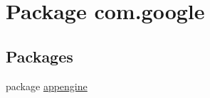 \hypertarget{namespacecom_1_1google}{\section{Package com.\-google}
\label{namespacecom_1_1google}
}
\subsection*{Packages}
\begin{DoxyCompactItemize}
\item 
package \hyperlink{namespacecom_1_1google_1_1appengine}{appengine}
\end{DoxyCompactItemize}
